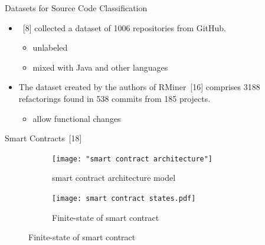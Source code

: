 \documentclass[xcolor=svgnames]{beamer}
\begin{document}
\begin{frame}{Datasets for Source Code Classification}
\begin{itemize}
\item {}~[8] collected a dataset of \num{1006} repositories from GitHub.
\begin{itemize}
\item unlabeled
\item mixed with Java and other languages
\end{itemize}

\item The dataset created by the authors of RMiner~[16] comprises \num{3188} refactorings found in 538 commits from 185 projects.
\begin{itemize}
\item allow functional changes
\end{itemize}
\end{itemize}

\end{frame}



\begin{frame}{Smart Contracts~[18]}

\begin{figure}
\centering
\begin{subfigure}[T]{0.3\textwidth}
	\texttt{[image: "smart contract architecture"]}
	\caption{smart contract architecture model}
\end{subfigure}
\hfill
\begin{subfigure}[T]{0.65\textwidth}
	\texttt{[image: smart contract states.pdf]}
	\caption{Finite-state of smart contract}
\end{subfigure}
\end{figure}


\end{frame}


\end{document}
